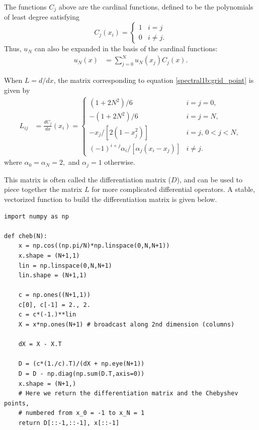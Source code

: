 The functions $C_j$ above are the cardinal functions, defined to be the polynomials of least degree satisfying
\begin{equation*}
C_j(x_i) = \begin{cases} 1 & i=j \\ 0 & i \not = j.
   \end{cases}
\end{equation*}
Thus, $u_N$ can also be expanded in the basis of the cardinal functions:
\begin{align*}
	u_N(x) &= \sum_{j=0}^N u_N(x_j)C_j(x).
\end{align*}

When $L = d/dx$, the matrix corresponding to equation \eqref{spectral1b:grid_point} is given by
\begin{align*}
L_{ij} &= \frac{dC_j}{dx}(x_i) =
\begin{cases} (1+2N^2)/6 & i=j=0, \\ -(1+2N^2)/6 & i=j=N, \\
-x_j/[2(1-x_j^2)] & i=j, \, 0<j<N, \\
(-1)^{i+j}\alpha_i/[\alpha_j(x_i-x_j)] & i \not = j.
   \end{cases}
\end{align*}
where $\alpha_0 = \alpha_N = 2,$ and $\alpha_j = 1$ otherwise.

This matrix is often called the differentiation matrix ($D$), and can be used to piece together the matrix $L$ for more complicated differential operators.
A stable, vectorized function to build the differentiation matrix is given below.


\begin{lstlisting}
import numpy as np

def cheb(N):
    x = np.cos((np.pi/N)*np.linspace(0,N,N+1))
    x.shape = (N+1,1)
    lin = np.linspace(0,N,N+1)
    lin.shape = (N+1,1)

    c = np.ones((N+1,1))
    c[0], c[-1] = 2., 2.
    c = c*(-1.)**lin
    X = x*np.ones(N+1) # broadcast along 2nd dimension (columns)

    dX = X - X.T

    D = (c*(1./c).T)/(dX + np.eye(N+1))
    D = D - np.diag(np.sum(D.T,axis=0))
    x.shape = (N+1,)
    # Here we return the differentiation matrix and the Chebyshev points,
    # numbered from x_0 = -1 to x_N = 1
    return D[::-1,::-1], x[::-1]

\end{lstlisting}



